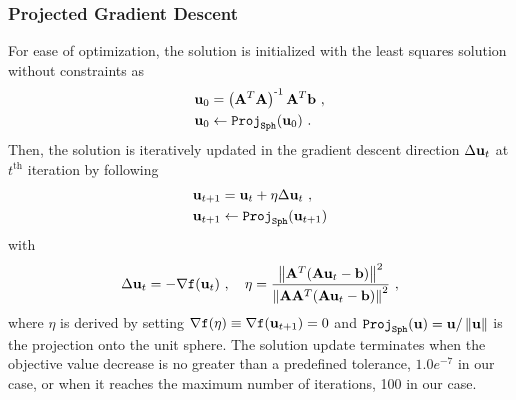 \subsubsection{Projected Gradient Descent}
For ease of optimization, the solution is initialized with the least squares solution without constraints as
\begin{align}
\mathbf{u}_0 &= \left( \mathbf{A}^T\mathbf{A} \right)^{\text{-}1} \mathbf{A}^T \mathbf{b}\ , \label{eq:origin} \\
\mathbf{u}_{0} &\leftarrow \texttt{Proj}_\texttt{Sph}(\mathbf{u}_{0})\ .
\end{align}
%
Then, the solution is iteratively updated in the gradient descent direction $\Delta \mathbf{u}_t$ at $t^{\text{th}}$ iteration by following
%
\begin{align}
\mathbf{u}_{t+1} &= \mathbf{u}_t +\eta \Delta \mathbf{u}_t\ , \\
\mathbf{u}_{t+1} &\leftarrow \texttt{Proj}_{\texttt{Sph}}(\mathbf{u}_{t+1})
\end{align}
%
with
%
\begin{align}
\Delta \mb{u}_t = -\nabla \texttt{f}(\mb{u}_t)\ ,
\quad
\eta = \frac{\norm{\mb{A}^T (\mb{A}\mb{u}_t-\mb{b})}^2}{\norm{\mb{A}\mb{A}^T(\mb{A}\mb{u}_t-\mb{b})}^2}\ ,
\end{align}
%
where $\eta$ is derived by setting $\nabla \texttt{f}(\eta) \equiv \nabla \texttt{f}(\mathbf{u}_{t+1})=0$ and $\texttt{Proj}_{\texttt{Sph}}(\mathbf{u})=\mathbf{u}/\left\lVert\mathbf{u}\right\rVert$ is the projection onto the unit sphere.
The solution update terminates when the objective value decrease is no greater than a predefined tolerance, $1.0e^{-7}$ in our case, or when it reaches the maximum number of iterations, 100 in our case.

